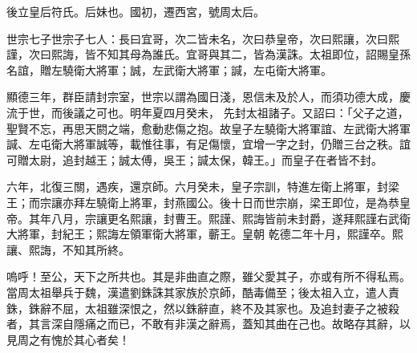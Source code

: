 \begin{pinyinscope}
 後立皇后符氏。后妹也。國初，遷西宮，號周太后。



 世宗七子世宗子七人：長曰宜哥，次二皆未名，次曰恭皇帝，次曰熙讓，次曰熙謹，次曰熙誨，皆不知其母為誰氏。宜哥與其二，皆為漢誅。太祖即位，詔賜皇孫名誼，贈左驍衛大將軍；誠，左武衛大將軍；諴，左屯衛大將軍。



 顯德三年，群臣請封宗室，世宗以謂為國日淺，恩信未及於人，而須功德大成，慶流于世，而後議之可也。明年夏四月癸未，
 先封太祖諸子。又詔曰：「父子之道，聖賢不忘，再思天閼之端，愈動悲傷之抱。故皇子左驍衛大將軍誼、左武衛大將軍諴、左屯衛大將軍誠等，載惟往事，有足傷懷，宜增一字之封，仍贈三台之秩。誼可贈太尉，追封越王；誠太傅，吳王；諴太保，韓王。」而皇子在者皆不封。



 六年，北復三關，遇疾，還京師。六月癸未，皇子宗訓，特進左衛上將軍，封梁王；而宗讓亦拜左驍衛上將軍，封燕國公。後十日而世宗崩，梁王即位，是為恭皇帝。其年八月，宗讓更名熙讓，封曹王。熙謹、熙誨皆前未封爵，遂拜熙謹右武衛大將軍，封紀王；熙誨左領軍衛大將軍，蘄王。皇朝
 乾德二年十月，熙謹卒。熙讓、熙誨，不知其所終。



 嗚呼！至公，天下之所共也。其是非曲直之際，雖父愛其子，亦或有所不得私焉。當周太祖舉兵于魏，漢遣劉銖誅其家族於京師，酷毒備至；後太祖入立，遣人責銖，銖辭不屈，太祖雖深恨之，然以銖辭直，終不及其家也。及追封妻子之被殺者，其言深自隱痛之而已，不敢有非漢之辭焉，蓋知其曲在己也。故略存其辭，以見周之有愧於其心者矣！



\end{pinyinscope}
